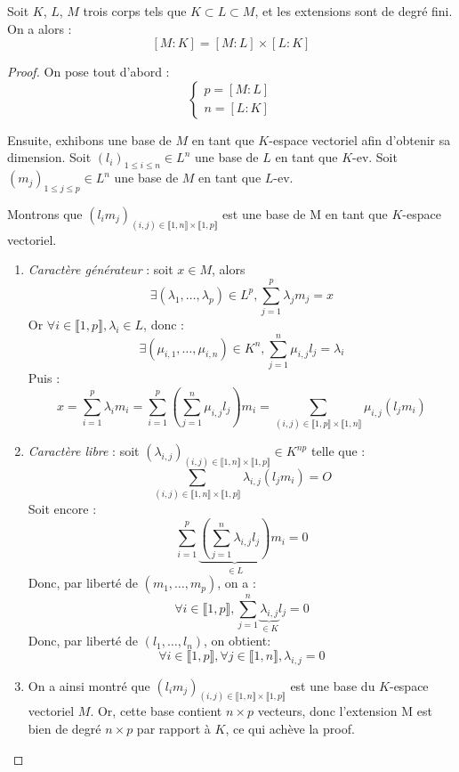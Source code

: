 \documentclass[a4paper,12pt,french]{report}
\begin{document}
			\begin{proposition}
				Soit \(K\), \(L\), \(M\) trois corps tels que \( K \subset L \subset M\), et les extensions sont de degré fini. On a alors :
				\[
				[M:K] = [M:L]{\times} [L:K]
				\]
			\end{proposition}
				\begin{proof}
					On pose tout d'abord :
					\[
					\left\{
						\begin{array}{ll}
							p = [M:L] \\
							n = [L:K]
						\end{array}
					\right.
					\]
					
					
					Ensuite, exhibons une base de \(M\) en tant que \(K\)-espace vectoriel afin d'obtenir sa dimension.
					Soit \((l_i)_{1 \leq i \leq n} \in L^n\) une base de \(L\) en tant que \(K\)-ev.
					Soit \((m_j)_{1 \leq j \leq p} \in L^n\) une base de \(M\) en tant que \(L\)-ev.
					
					Montrons que \((l_i m_j)_{(i, j) \in \llbracket 1, n \rrbracket \times \llbracket 1, p \rrbracket}\) est une base de M en tant que \(K\)-espace vectoriel.
					\begin{enumerate}
					\item \emph{Caractère générateur} : soit \(x \in M\), alors 
						\[
						\exists (\lambda_1, \dots, \lambda_p) \in L^p, \sum_{j  = 1}^{p} \lambda_j m_j = x
						\]
						Or \(\forall i \in \llbracket 1, p \rrbracket, \lambda_i \in L\), donc :
						\[ 
						\exists (\mu_{i, 1}, \dots, \mu_{i, n}) \in K^n, \sum_{j  = 1}^{n} \mu_{i, j} l_j = \lambda_i 
						\]
						Puis :
						\[
						x 	= \sum_{i  = 1}^{p} \lambda_i m_i  
							= \sum_{i  = 1}^{p} \left(\sum_{j  = 1}^{n} \mu_{i, j} l_j\right) m_i 
							= \sum_{(i, j) \in \llbracket 1, p \rrbracket \times \llbracket 1, n \rrbracket}\mu_{i, j} (l_j m_i)
						\]
					\item \emph{Caractère libre} : soit \((\lambda_{i, j})_{ (i, j) \in \llbracket 1, n \rrbracket \times \llbracket 1, p \rrbracket} \in K^{np}\) telle que :
							\[
							\sum_{(i, j) \in \llbracket 1, n \rrbracket \times \llbracket 1, p \rrbracket} \lambda_{i, j} (l_j m_i) = O
							\]
						Soit encore :
							\[
							\sum_{i=1}^{p} \underbrace{\left( \sum_{j = 1}^{n} \lambda_{i, j} l_j \right)}_{\in L}m_i = 0
							\]
						Donc, par liberté de \((m_1, \dots, m_p)\), on a :
							\[
							\forall i \in \llbracket 1, p \rrbracket, \sum_{j = 1}^{n} \underbrace{\lambda_{i, j}}_{\in K} l_j = 0
							\]
						Donc, par liberté de \((l_1, \dots, l_n)\), on obtient:
							\[
							\forall i \in \llbracket 1, p \rrbracket, \forall j \in \llbracket 1, n \rrbracket, \lambda_{i, j} = 0
							\]
					\item On a ainsi montré que \((l_i m_j)_{(i, j) \in \llbracket 1, n \rrbracket \times \llbracket 1, p \rrbracket}\) est une base du \(K\)-espace vectoriel \(M\). Or, cette base contient \(n\times p\) vecteurs, donc l'extension M est bien de degré \(n\times p\) par rapport à \(K\), ce qui achève la proof. \( \)
					
					\end{enumerate}
				\end{proof}
			
\end{document}
